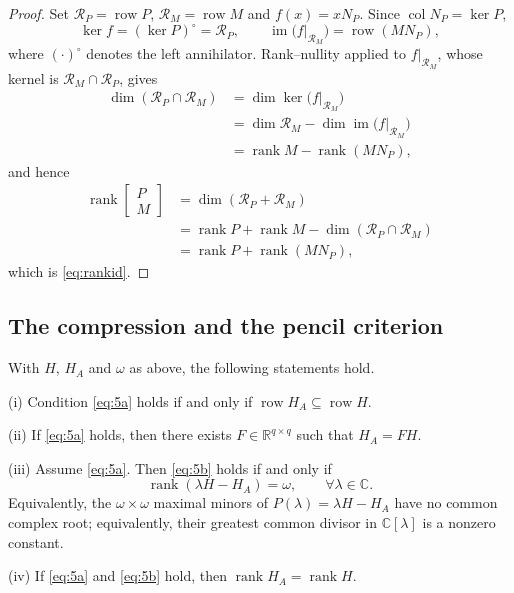\begin{proof}
Set $\mathcal R_P=\operatorname{row}P$, $\mathcal R_M=\operatorname{row}M$ and $f(x)=xN_P$. Since $\operatorname{col}N_P=\ker P$,
\begin{equation*}
\ker f=(\ker P)^{\circ}=\mathcal R_P,\qquad
\operatorname{im}\bigl(f|_{\mathcal R_M}\bigr)=\operatorname{row}(MN_P),
\end{equation*}
where $(\cdot)^{\circ}$ denotes the left annihilator. Rank--nullity applied to $f|_{\mathcal R_M}$, whose kernel is $\mathcal R_M\cap\mathcal R_P$, gives
\begin{equation*}
\begin{aligned}
\dim(\mathcal R_P\cap\mathcal R_M)
&=\dim\ker\bigl(f|_{\mathcal R_M}\bigr)\\
&=\dim\mathcal R_M-\dim\operatorname{im}\bigl(f|_{\mathcal R_M}\bigr)\\
&=\operatorname{rank}M-\operatorname{rank}(MN_P),
\end{aligned}
\end{equation*}
and hence
\begin{equation*}
\begin{aligned}
\operatorname{rank}\begin{bmatrix}P\\ M\end{bmatrix}
&=\dim(\mathcal R_P+\mathcal R_M)\\
&=\operatorname{rank}P+\operatorname{rank}M-\dim(\mathcal R_P\cap\mathcal R_M)\\
&=\operatorname{rank}P+\operatorname{rank}(MN_P),
\end{aligned}
\end{equation*}
which is \eqref{eq:rankid}.
\end{proof}

\subsection{The compression and the pencil criterion}\label{sec:compression}

\begin{lem}\label{lem:compression}
With $H$, $H_A$ and $\omega$ as above, the following statements hold.

(i) Condition \eqref{eq:5a} holds if and only if $\operatorname{row}H_A\subseteq\operatorname{row}H$.

(ii) If \eqref{eq:5a} holds, then there exists $F\in\mathbb R^{q\times q}$ such that $H_A=FH$.

(iii) Assume \eqref{eq:5a}. Then \eqref{eq:5b} holds if and only if
\begin{equation*}
\operatorname{rank}(\lambda H-H_A)=\omega,\qquad \forall\lambda\in\mathbb C .
\end{equation*}
Equivalently, the $\omega\times\omega$ maximal minors of $P(\lambda)=\lambda H-H_A$ have no common complex root; equivalently, their greatest common divisor in $\mathbb C[\lambda]$ is a nonzero constant.

(iv) If \eqref{eq:5a} and \eqref{eq:5b} hold, then $\operatorname{rank}H_A=\operatorname{rank}H$.
\end{lem}

